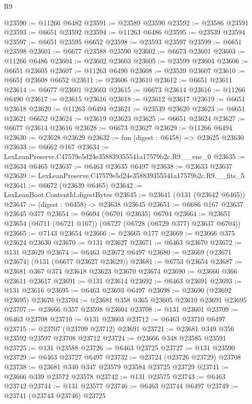\begin{lexlean}{R9}
\begin{coremodule}
@23590 := @11266 @6482
@23591 := @23589 @23590
@23592 := @23586 @23591
@23593 := @6651 @23592
@23594 := @11263 @6486
@23595 := @23539 @23594
@23597 := @6651 @23595 @6652
@23598 := @23593 @23597
@23599 := @6651 @23598
@23601 := @6677 @23588 @23590
@23602 := @6673 @23601
@23603 := @11266 @6486
@23604 := @23602 @23603
@23605 := @23599 @23604
@23606 := @6651 @23605
@23607 := @11263 @6490
@23608 := @23539 @23607
@23610 := @6651 @23608 @6652
@23611 := @23606 @23610
@23612 := @6651 @23611
@23614 := @6677 @23601 @23603
@23615 := @6673 @23614
@23616 := @11266 @6490
@23617 := @23615 @23616
@23618 := @23612 @23617
@23619 := @6651 @23618
@23620 := @11263 @6494
@23621 := @23539 @23620
@23623 := @6651 @23621 @6652
@23624 := @23619 @23623
@23625 := @6651 @23624
@23627 := @6677 @23614 @23616
@23628 := @6673 @23627
@23629 := @11266 @6494
@23630 := @23628 @23629
@23632 := fun (digest : @6458) => @23625 @23630
@23633 := @6662 @167
@23634 := LexLeanPreserve.C47579e5d24e358839355541a17579b2c.R9.__enc_0
@23635 := @23634 @6465
@23637 := @6463 @23635 @6497
@23638 := @23633 @23637
@23639 := LexLeanPreserve.C47579e5d24e358839355541a17579b2c.R9.__fits_5
@23641 := @6672 (@23639 @6465)
@23642 := LexLeanBoot.ContentId.digestBytes
@23645 := @23641 (@131 (@23642 @6465))
@23647 := (digest : @6458) -> @23638 @23645
@23651 := @6686 @167 @23637 @23645 @377
@23654 := @6694 (@6701 @23635) @6704
@23664 := @23651 @23654 (@6711 (@6721 @167)) (@6727 (@6728 (@6729 @377) @23637 @6704))
@23665 := @7143 @23654
@23666 := @23665 @177
@23669 := @23666 @375 @23624 @23630
@23670 := @131 @23627
@23671 := @6463 @23670
@23672 := @131 @23629
@23674 := @6463 @23672 @6497
@23680 := @23669 (@23671 @23674) (@131 (@6677 @23627 @23629))
@23681 := @6753 @23654
@23687 := @23681 @367 @374 @23618 @23623 @23670 @23674
@23690 := @23666 @366 @23611 @23617
@23691 := @131 @23614
@23692 := @6463 @23691
@23693 := @131 @23616
@23695 := @6463 @23693 @6497
@23698 := @23690 (@23692 @23695) @23670
@23704 := @23681 @358 @365 @23605 @23610 @23691 @23695
@23707 := @23666 @357 @23598 @23604
@23708 := @131 @23601
@23709 := @6463 @23708
@23710 := @131 @23603
@23712 := @6463 @23710 @6497
@23715 := @23707 (@23709 @23712) @23691
@23721 := @23681 @349 @356 @23592 @23597 @23708 @23712
@23724 := @23666 @348 @23585 @23591
@23725 := @131 @23588
@23726 := @6463 @23725
@23727 := @131 @23590
@23729 := @6463 @23727 @6497
@23732 := @23724 (@23726 @23729) @23708
@23738 := @23681 @340 @347 @23579 @23584 @23725 @23729
@23741 := @23666 @339 @23572 @23578
@23742 := @131 @23575
@23743 := @6463 @23742
@23744 := @131 @23577
@23746 := @6463 @23744 @6497
@23749 := @23741 (@23743 @23746) @23725

\end{coremodule}
\end{lexlean}
